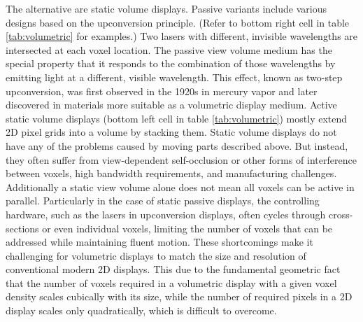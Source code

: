 The alternative are static volume displays. Passive variants include various designs based on the upconversion principle. (Refer to bottom right cell in table \ref{tab:volumetric} for examples.) Two lasers with different, invisible wavelengths are intersected at each voxel location. The passive view volume medium has the special property that it responds to the combination of those wavelengths by emitting light at a different, visible wavelength. This effect, known as two-step upconversion, was first observed in the 1920s in mercury vapor \cite{fuchtbauer1920excitation} and later discovered in materials more suitable as a volumetric display medium. Active static volume displays (bottom left cell in table \ref{tab:volumetric}) mostly extend 2D pixel grids into a volume by stacking them. Static volume displays do not have any of the problems caused by moving parts described above. But instead, they often suffer from view-dependent self-occlusion or other forms of interference between voxels, high bandwidth requirements, and manufacturing challenges. Additionally a static view volume alone does not mean all voxels can be active in parallel. Particularly in the case of static passive displays, the controlling hardware, such as the lasers in upconversion displays, often cycles through cross-sections or even individual voxels, limiting the number of voxels that can be addressed while maintaining fluent motion. These shortcomings make it challenging for volumetric displays to match the size and resolution of conventional modern 2D displays. This due to the fundamental geometric fact that the number of voxels required in a volumetric display with a given voxel density scales cubically with its size, while the number of required pixels in a 2D display scales only quadratically, which is difficult to overcome.

